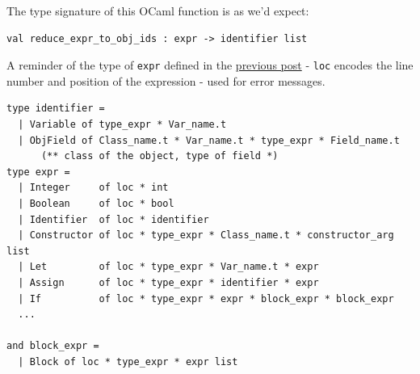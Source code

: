 The type signature of this OCaml function is as we'd expect:

%

\begin{lstlisting}[language=caml,caption={data\_race\_checker\_env.mli}]
val reduce_expr_to_obj_ids : expr -> identifier list
\end{lstlisting}

A reminder of the type of \texttt{expr} defined in the
\href{https://mukulrathi.com/create-your-own-programming-language/intro-to-type-checking/\#annotating-our-ast-with-types}{previous
post} - \texttt{loc} encodes the line number and position of the
expression - used for error messages.

%

\begin{lstlisting}[language=caml,caption={typed\_ast.mli}]
type identifier =
  | Variable of type_expr * Var_name.t
  | ObjField of Class_name.t * Var_name.t * type_expr * Field_name.t
      (** class of the object, type of field *)
type expr =
  | Integer     of loc * int
  | Boolean     of loc * bool
  | Identifier  of loc * identifier
  | Constructor of loc * type_expr * Class_name.t * constructor_arg list
  | Let         of loc * type_expr * Var_name.t * expr
  | Assign      of loc * type_expr * identifier * expr
  | If          of loc * type_expr * expr * block_expr * block_expr
  ...

and block_expr =
  | Block of loc * type_expr * expr list
\end{lstlisting}


